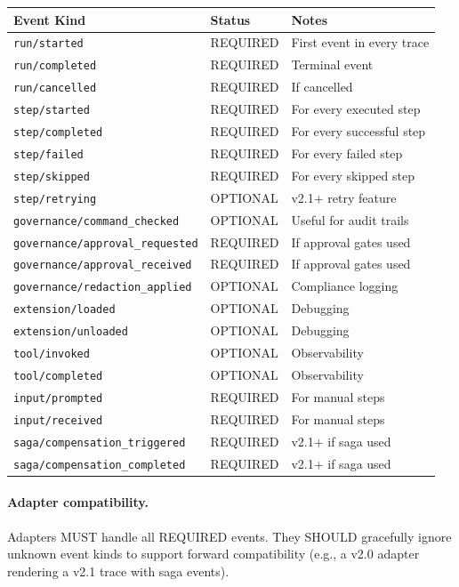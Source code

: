 \begin{center}
\small
\begin{tabular}{llp{6cm}}
\textbf{Event Kind} & \textbf{Status} & \textbf{Notes} \\
\hline
\texttt{run/started} & REQUIRED & First event in every trace \\
\texttt{run/completed} & REQUIRED & Terminal event \\
\texttt{run/cancelled} & REQUIRED & If cancelled \\
\texttt{step/started} & REQUIRED & For every executed step \\
\texttt{step/completed} & REQUIRED & For every successful step \\
\texttt{step/failed} & REQUIRED & For every failed step \\
\texttt{step/skipped} & REQUIRED & For every skipped step \\
\texttt{step/retrying} & OPTIONAL & v2.1+ retry feature \\
\texttt{governance/command\_checked} & OPTIONAL & Useful for audit trails \\
\texttt{governance/approval\_requested} & REQUIRED & If approval gates used \\
\texttt{governance/approval\_received} & REQUIRED & If approval gates used \\
\texttt{governance/redaction\_applied} & OPTIONAL & Compliance logging \\
\texttt{extension/loaded} & OPTIONAL & Debugging \\
\texttt{extension/unloaded} & OPTIONAL & Debugging \\
\texttt{tool/invoked} & OPTIONAL & Observability \\
\texttt{tool/completed} & OPTIONAL & Observability \\
\texttt{input/prompted} & REQUIRED & For manual steps \\
\texttt{input/received} & REQUIRED & For manual steps \\
\texttt{saga/compensation\_triggered} & REQUIRED & v2.1+ if saga used \\
\texttt{saga/compensation\_completed} & REQUIRED & v2.1+ if saga used \\
\end{tabular}
\end{center}

\paragraph{Adapter compatibility.} Adapters MUST handle all REQUIRED events. They SHOULD gracefully ignore unknown event kinds to support forward compatibility (e.g., a v2.0 adapter rendering a v2.1 trace with saga events).

